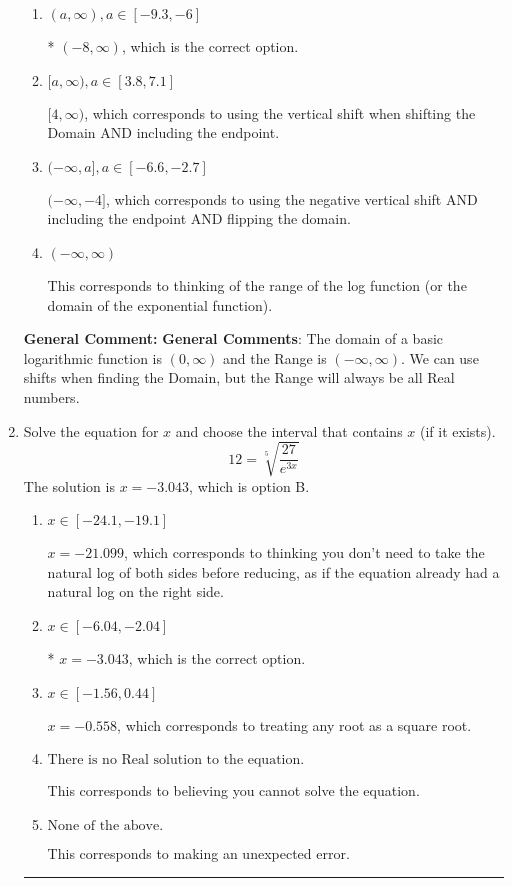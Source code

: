 \documentclass{extbook}[14pt]
\newcommand{\litem}[1]{\item #1

\rule{\textwidth}{0.4pt}}
\begin{document}
\begin{enumerate}
{\begin{enumerate}[label=\Alph*.]
$(-\infty, 8)$, which corresponds to flipping the Domain. Remember: the general for is $a*\log(x-h)+k$, \textbf{where $a$ does not affect the domain}.
\item \( (a, \infty), a \in [-9.3, -6] \)

* $(-8, \infty)$, which is the correct option.
\item \( [a, \infty), a \in [3.8, 7.1] \)

$[4, \infty)$, which corresponds to using the vertical shift when shifting the Domain AND including the endpoint.
\item \( (-\infty, a], a \in [-6.6, -2.7] \)

$(-\infty, -4]$, which corresponds to using the negative vertical shift AND including the endpoint AND flipping the domain.
\item \( (-\infty, \infty) \)

This corresponds to thinking of the range of the log function (or the domain of the exponential function).
\end{enumerate}

\textbf{General Comment:} \textbf{General Comments}: The domain of a basic logarithmic function is $(0, \infty)$ and the Range is $(-\infty, \infty)$. We can use shifts when finding the Domain, but the Range will always be all Real numbers.
}
\litem{
 Solve the equation for $x$ and choose the interval that contains $x$ (if it exists).
\[  12 = \sqrt[5]{\frac{27}{e^{3x}}} \]The solution is \( x = -3.043 \), which is option B.\begin{enumerate}[label=\Alph*.]
\item \( x \in [-24.1, -19.1] \)

$x = -21.099$, which corresponds to thinking you don't need to take the natural log of both sides before reducing, as if the equation already had a natural log on the right side.
\item \( x \in [-6.04, -2.04] \)

* $x = -3.043$, which is the correct option.
\item \( x \in [-1.56, 0.44] \)

$x = -0.558$, which corresponds to treating any root as a square root.
\item \( \text{There is no Real solution to the equation.} \)

This corresponds to believing you cannot solve the equation.
\item \( \text{None of the above.} \)

This corresponds to making an unexpected error.
\end{enumerate}

}
\end{enumerate}
\end{document}
